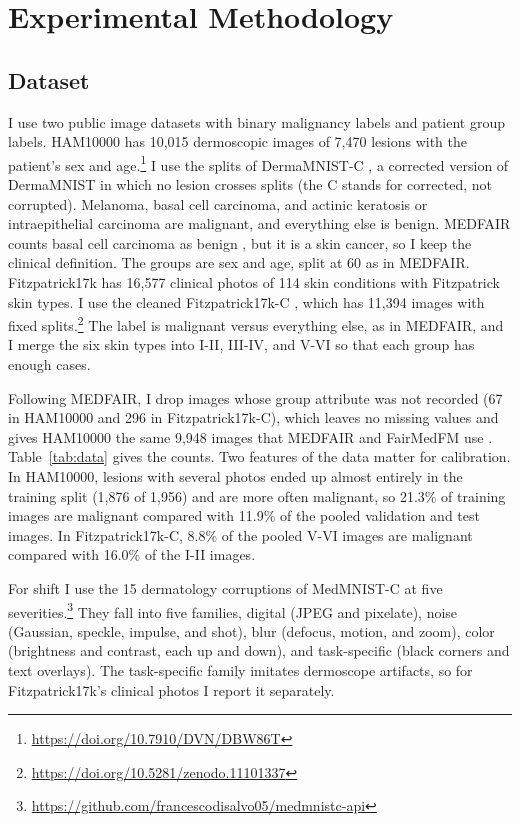\documentclass[sigconf,nonacm]{acmart}
\begin{document}
\section{Experimental Methodology}
\label{sec:experiments}

\subsection{Dataset}
\label{sec:data}

I use two public image datasets with binary malignancy labels and patient group labels. HAM10000 \cite{tschandl2018ham10000} has 10,015 dermoscopic images of 7,470 lesions with the patient's sex and age.\footnote{\url{https://doi.org/10.7910/DVN/DBW86T}} I use the splits of DermaMNIST-C \cite{abhishek2025quality}, a corrected version of DermaMNIST in which no lesion crosses splits (the C stands for corrected, not corrupted). Melanoma, basal cell carcinoma, and actinic keratosis or intraepithelial carcinoma are malignant, and everything else is benign. MEDFAIR counts basal cell carcinoma as benign \cite{zong2023medfair}, but it is a skin cancer, so I keep the clinical definition. The groups are sex and age, split at 60 as in MEDFAIR. Fitzpatrick17k \cite{groh2021fitzpatrick} has 16,577 clinical photos of 114 skin conditions with Fitzpatrick skin types. I use the cleaned Fitzpatrick17k-C \cite{abhishek2025quality}, which has 11,394 images with fixed splits.\footnote{\url{https://doi.org/10.5281/zenodo.11101337}} The label is malignant versus everything else, as in MEDFAIR, and I merge the six skin types into I-II, III-IV, and V-VI so that each group has enough cases.

Following MEDFAIR, I drop images whose group attribute was not recorded (67 in HAM10000 and 296 in Fitzpatrick17k-C), which leaves no missing values and gives HAM10000 the same 9,948 images that MEDFAIR and FairMedFM use \cite{zong2023medfair,jin2024fairmedfm}. Table~\ref{tab:data} gives the counts. Two features of the data matter for calibration. In HAM10000, lesions with several photos ended up almost entirely in the training split (1,876 of 1,956) and are more often malignant, so 21.3\% of training images are malignant compared with 11.9\% of the pooled validation and test images. In Fitzpatrick17k-C, 8.8\% of the pooled V-VI images are malignant compared with 16.0\% of the I-II images.

For shift I use the 15 dermatology corruptions of MedMNIST-C \cite{disalvo2024medmnistc} at five severities.\footnote{\url{https://github.com/francescodisalvo05/medmnistc-api}} They fall into five families, digital (JPEG and pixelate), noise (Gaussian, speckle, impulse, and shot), blur (defocus, motion, and zoom), color (brightness and contrast, each up and down), and task-specific (black corners and text overlays). The task-specific family imitates dermoscope artifacts, so for Fitzpatrick17k's clinical photos I report it separately.
\end{document}
